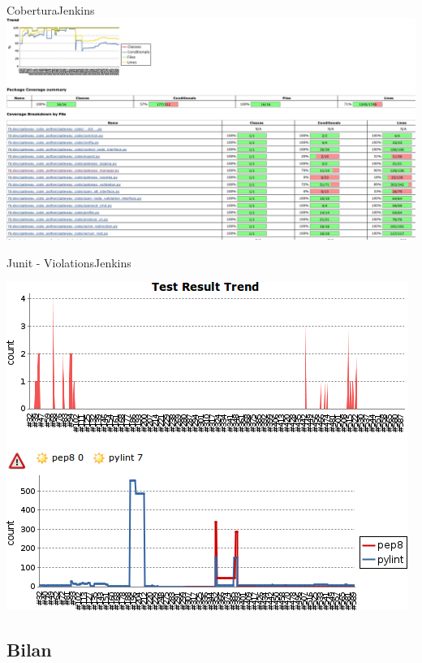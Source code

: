\documentclass[9pt]{beamer}
\begin{document}
\begin{frame}{Cobertura}{Jenkins}
  \includegraphics[width=\linewidth]{images/cobertura}\\
\end{frame}
\begin{frame}{Junit - Violations}{Jenkins}
  \begin{center}
    \includegraphics[height=0.8\textheight]{images/junit_violations}\\
  \end{center}
\end{frame}



\subsection{Bilan}
\frame{\tableofcontents[currentsubsection,sectionstyle=show/shaded,subsectionstyle=show/shaded,subsubsectionstyle=show/show/shaded]}
\end{document}
